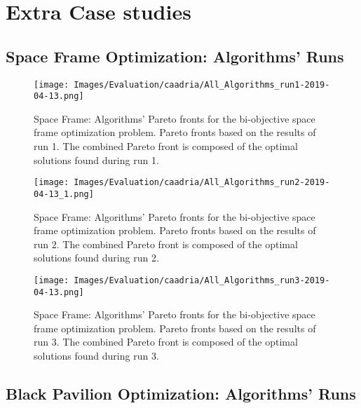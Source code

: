 \appendix\chapter{Extra Case studies}
\label{appendix:appendixB}

\section{Space Frame Optimization: Algorithms' Runs}
\label{sec:spaceframeoptimizationextra}

\begin{figure}[htbp]
	\centering
	\texttt{[image: Images/Evaluation/caadria/All\_Algorithms\_run1-2019-04-13.png]}
	\caption[Space Frame: Pareto Fronts for run 1]{Space Frame: Algorithms' Pareto fronts for the bi-objective space frame optimization problem. Pareto fronts based on the results of run 1. The combined Pareto front is composed of the optimal solutions found during run 1.}
	\label{table:spaceframerun1}
\end{figure}

\begin{figure}[htbp]
	\centering
	\texttt{[image: Images/Evaluation/caadria/All\_Algorithms\_run2-2019-04-13\_1.png]}
	\caption[Space Frame: Pareto Fronts for run 2]{Space Frame: Algorithms' Pareto fronts for the bi-objective space frame optimization problem. Pareto fronts based on the results of run 2. The combined Pareto front is composed of the optimal solutions found during run 2.}
	\label{table:spaceframesrun2}
\end{figure}

\begin{figure}[htbp]
	\centering
	\texttt{[image: Images/Evaluation/caadria/All\_Algorithms\_run3-2019-04-13.png]}
	\caption[Space Frame: Pareto Fronts for run 3]{Space Frame: Algorithms' Pareto fronts for the bi-objective space frame optimization problem. Pareto fronts based on the results of run 3. The combined Pareto front is composed of the optimal solutions found during run 3.}
	\label{table:spaceframerun3}
\end{figure}


\section{Black Pavilion Optimization: Algorithms' Runs}
\label{sec:blackpavilionextra}
